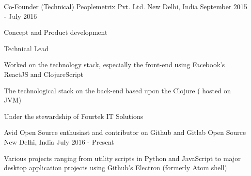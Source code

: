 \begin{cventries}
  \cventry
    {Co-Founder (Technical)} %
    {Peoplemetrix Pvt. Ltd.  } %
    {New Delhi, India} %
    {September 2015 - July 2016} %
    {
      \begin{cvitems} %
        \item {Concept and Product development}
        \item { Technical Lead}
        \item { Worked on the technology stack, especially the front-end using
            Facebook's ReactJS and ClojureScript}
        \item { The technological stack on the back-end based upon the Clojure (
            hosted on JVM) }
        \item { Under the stewardship of Fourtek IT Solutions}
      \end{cvitems}
    }

  \cventry
    {Avid Open Source enthusiast and contributor on Github and Gitlab}
    {Open Source}
    {New Delhi, India}
    {July 2016 - Present}
    {
      \begin{cvitems}
        \item {Various projects ranging from utility scripts in Python and JavaScript to major desktop application projects using Github's Electron (formerly Atom shell) }
      \end{cvitems}
    }
\end{cventries}
